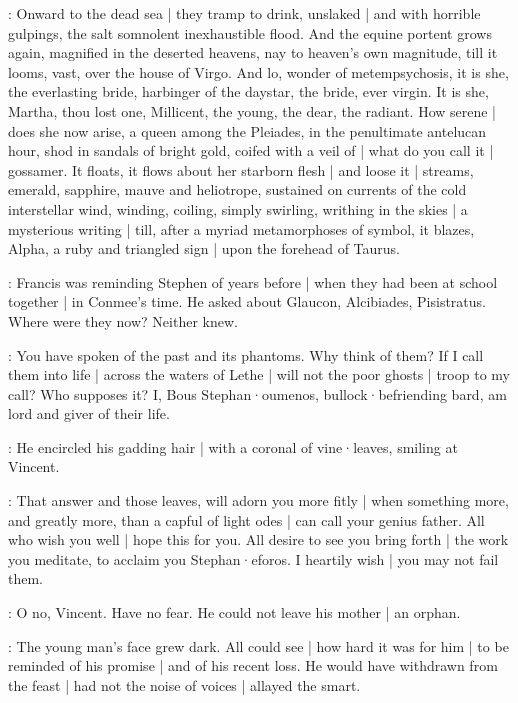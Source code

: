 \begin{omitted}
:
Onward to the dead sea |
they tramp to drink,
unslaked |
and with horrible gulpings,
the salt somnolent inexhaustible flood.
And the equine portent grows again,
magnified in the deserted heavens,
nay to heaven's own magnitude,
till it looms,
vast,
over the house of Virgo.
And lo,
wonder of metempsychosis,
it is she,
the everlasting bride,
harbinger of the daystar,
the bride,
ever virgin.
It is she,
Martha,
thou lost one,
Millicent,
the young,
the dear,
the radiant.
How serene |
does she now arise,
a queen among the Pleiades,
in the penultimate antelucan hour,
shod in sandals of bright gold,
coifed with a veil of |
what do you call it |
gossamer.
It floats,
it flows about her starborn flesh |
and loose it |
streams,
emerald,
sapphire,
mauve and heliotrope,
sustained on currents of the cold interstellar wind,
winding,
coiling,
simply swirling,
writhing in the skies |
a mysterious writing |
till,
after a myriad metamorphoses of symbol,
it blazes,
Alpha,
a ruby and triangled sign |
upon the forehead of Taurus.
\end{omitted}



:
Francis was reminding Stephen of years before |
when they had been at school together |
in Conmee's time.
He asked about Glaucon,
Alcibiades,
Pisistratus.
Where were they now?
Neither knew.

\stephen:
You have spoken of the past and its phantoms.
Why think of them?
If I call them into life |
across the waters of Lethe |
will not the poor ghosts |
troop to my call?
Who supposes it?
I,
Bous Stephan·oumenos,
bullock·befriending bard,
am lord and giver of their life.

:
He encircled his gadding hair |
with a coronal of vine·leaves,
smiling at Vincent.

\lynch:
That answer and those leaves,
will adorn you more fitly |
when something more,
and greatly more,
than a capful of light odes |
can call your genius father.
All who wish you well |
hope this for you.
All desire to see you bring forth |
the work you meditate,
to acclaim you Stephan·eforos.
I heartily wish |
you may not fail them.

\lenehan:
O no,
Vincent.
Have no fear.
He could not leave his mother |
an orphan.

:
The young man's face grew dark.
All could see |
how hard it was for him |
to be reminded of his promise |
and of his recent loss.
He would have withdrawn from the feast |
had not the noise of voices |
allayed the smart.

